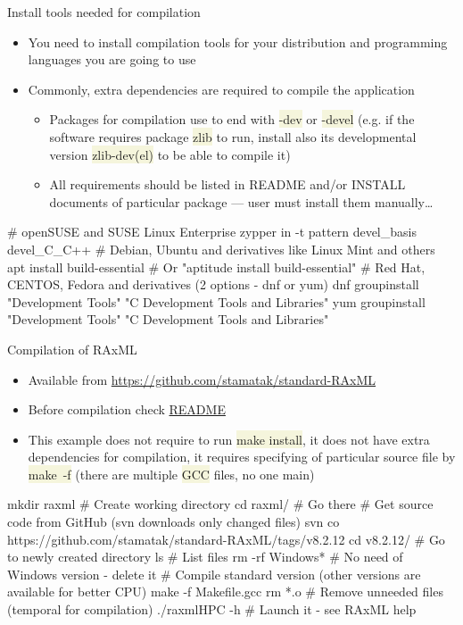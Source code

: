 \documentclass[compress, ucs, xelatex, 11pt, xcolor=svgnames, aspectratio=169,
	hyperref={
		bookmarks=true,
		unicode=true,
		colorlinks=true,
		pdftitle={Linux, command line and MetaCentrum},
		plainpages=false,
		pdfauthor={Vojtech Zeisek},
		pdfsubject={Course about use of Linux command line, writing shell scripts and using MetaCentrum of CESNET},
		pdfcreator={XeLaTeX},
		pdfkeywords={Linux, GNU, BASH, shell, command line, MetaCentrum},
		linkcolor=DarkRed, %
		anchorcolor=DarkBlue, %
		citecolor=Indigo, %
		filecolor=NavyBlue, %
		menucolor=DarkMagenta, %
		urlcolor=DarkBlue, %
		pdftex},
	url={hyphens, lowtilde} %
	]{beamer}
\renewcommand{\texttt}[1]{\colorbox{Beige}{{\ttfamily #1}}}
\begin{document}
\begin{frame}[fragile]{Install tools needed for compilation}
	\begin{itemize}
		\item You need to install compilation tools for your distribution and programming languages you are going to use
		\item Commonly, extra dependencies are required to compile the application
		\begin{itemize}
			\item Packages for compilation use to end with \texttt{-dev} or \texttt{-devel} (e.g. if the software requires package \texttt{zlib} to run, install also its developmental version \texttt{zlib-dev(el)} to be able to compile it)
			\item All requirements should be listed in README and/or INSTALL documents of particular package --- user must install them manually\ldots
		\end{itemize}
	\end{itemize}
	\vfill
	\begin{bashcode}
    # openSUSE and SUSE Linux Enterprise
    zypper in -t pattern devel_basis devel_C_C++
    # Debian, Ubuntu and derivatives like Linux Mint and others
    apt install build-essential # Or "aptitude install build-essential"
    # Red Hat, CENTOS, Fedora and derivatives (2 options - dnf or yum)
    dnf groupinstall "Development Tools" "C Development Tools and Libraries"
    yum groupinstall "Development Tools" "C Development Tools and Libraries"
	\end{bashcode}
\end{frame}

\begin{frame}[fragile]{Compilation of RAxML}
	\begin{itemize}
		\item Available from \url{https://github.com/stamatak/standard-RAxML}
		\item Before compilation check \href{https://github.com/stamatak/standard-RAxML/blob/master/README}{README}
		\item This example does not require to run \texttt{make install}, it does not have extra dependencies for compilation, it requires specifying of particular source file by \texttt{make~-f} (there are multiple \texttt{GCC} files, no one main)
	\end{itemize}
	\begin{bashcode}
    mkdir raxml # Create working directory
    cd raxml/ # Go there
    # Get source code from GitHub (svn downloads only changed files)
    svn co https://github.com/stamatak/standard-RAxML/tags/v8.2.12
    cd v8.2.12/ # Go to newly created directory
    ls # List files
    rm -rf Windows* # No need of Windows version - delete it
    # Compile standard version (other versions are available for better CPU)
    make -f Makefile.gcc
    rm *.o # Remove unneeded files (temporal for compilation)
    ./raxmlHPC -h # Launch it - see RAxML help
	\end{bashcode}
\end{frame}
\end{document}
